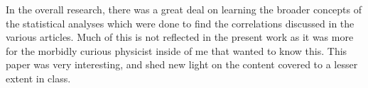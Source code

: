 \documentclass[12pt, letterpaper]{article}
\begin{document}
In the overall research, there was a great deal on learning the broader concepts of the statistical analyses which were done to find the correlations discussed in the various articles. Much of this is not reflected in the present work as it was more for the morbidly curious physicist inside of me that wanted to know this. This paper was very interesting, and shed new light on the content covered to a lesser extent in class. 

\singlespacing
{}
\doublespacing



\end{document}
